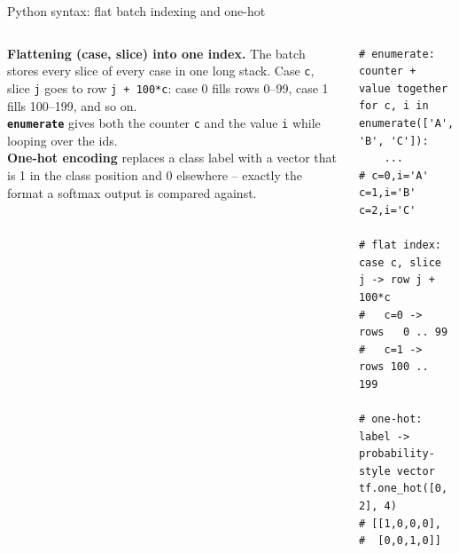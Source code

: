 \documentclass[10pt,aspectratio=169]{beamer}
\renewcommand{\section}[2][]{}
\begin{document}
\begin{frame}[fragile]{Python syntax: flat batch indexing and one-hot}
\begin{columns}[T,onlytextwidth]
\begin{column}{0.42\textwidth}
\small
\textbf{Flattening (case, slice) into one index.} The batch stores every slice of every case in one
long stack. Case \texttt{c}, slice \texttt{j} goes to row \texttt{j + 100*c}: case 0 fills rows
0--99, case 1 fills 100--199, and so on.\\[0.4em]
\textbf{\texttt{enumerate}} gives both the counter \texttt{c} and the value \texttt{i} while looping
over the ids.\\[0.4em]
\textbf{One-hot encoding} replaces a class label with a vector that is 1 in the class position and 0
elsewhere -- exactly the format a softmax output is compared against.
\end{column}
\begin{column}{0.56\textwidth}
\begin{lstlisting}[stepnumber=0]
# enumerate: counter + value together
for c, i in enumerate(['A', 'B', 'C']):
    ...        # c=0,i='A'  c=1,i='B'  c=2,i='C'

# flat index: case c, slice j -> row j + 100*c
#   c=0 -> rows   0 .. 99
#   c=1 -> rows 100 .. 199

# one-hot: label -> probability-style vector
tf.one_hot([0, 2], 4)
# [[1,0,0,0],
#  [0,0,1,0]]
\end{lstlisting}
\end{column}
\end{columns}
\end{frame}

\section{Loss and metrics}
\end{document}
